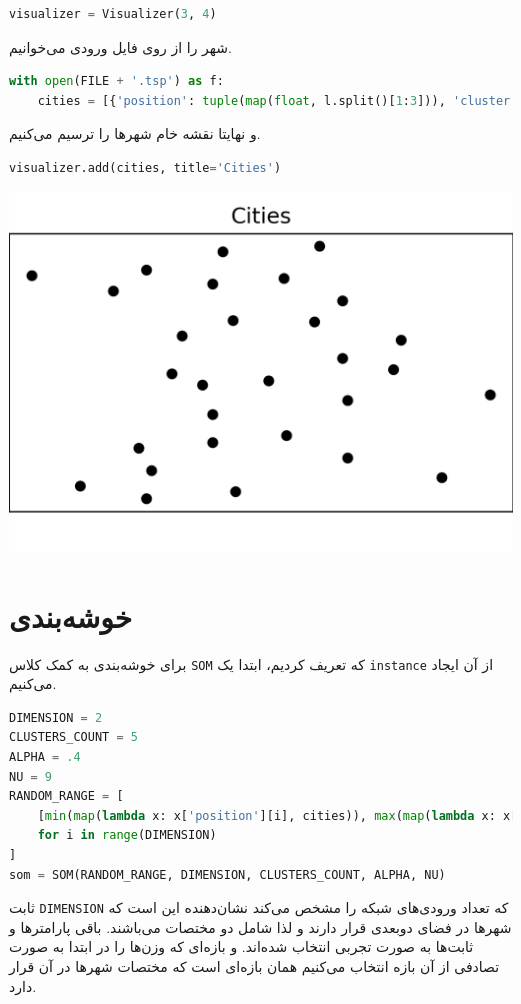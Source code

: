 \documentclass[a4paper, 12pt]{article}
\theoremstyle{definition}
\begin{document}
\LTR
\begin{lstlisting}[language=Python]
visualizer = Visualizer(3, 4)    
\end{lstlisting}
\RTL

شهر را از روی فایل ورودی می‌خوانیم.

\LTR
\begin{lstlisting}[language=Python]
with open(FILE + '.tsp') as f:
    cities = [{'position': tuple(map(float, l.split()[1:3])), 'cluster': None} for l in f.readlines()]
\end{lstlisting}
\RTL

و نهایتا نقشه خام شهرها را ترسیم می‌کنیم.

\LTR
\begin{lstlisting}[language=Python]
visualizer.add(cities, title='Cities')
\end{lstlisting}
\RTL

\begin{center}
    \includegraphics[width=.5\textwidth]{1/0.png}
\end{center}

\section{خوشه‌بندی}

برای خوشه‌بندی به کمک کلاس
\texttt{SOM}
که تعریف کردیم، ابتدا یک
\texttt{instance}
از آن ایجاد می‌کنیم.

\LTR
\begin{lstlisting}[language=Python]
DIMENSION = 2
CLUSTERS_COUNT = 5
ALPHA = .4
NU = 9
RANDOM_RANGE = [
    [min(map(lambda x: x['position'][i], cities)), max(map(lambda x: x['position'][i], cities)) + 1]
    for i in range(DIMENSION)
]
som = SOM(RANDOM_RANGE, DIMENSION, CLUSTERS_COUNT, ALPHA, NU)
\end{lstlisting}
\RTL

ثابت
\texttt{DIMENSION}
که تعداد ورودی‌های شبکه را مشخص می‌کند نشان‌دهنده این است که شهرها در فضای دوبعدی قرار دارند و لذا شامل دو مختصات می‌باشند. باقی پارامتر‌ها و ثابت‌ها به صورت تجربی انتخاب شده‌اند. و بازه‌ای که وزن‌ها را در ابتدا به صورت تصادفی از آن بازه انتخاب می‌کنیم همان بازه‌ای است که مختصات شهرها در آن قرار دارد.
\end{document}
